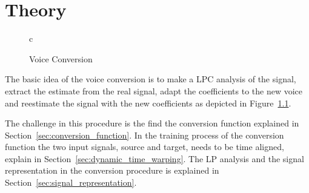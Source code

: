 \chapter{Theory} %
\label{cha:theory}
\begin{figure}[htbp]
  \centering
   \begin{tabular}[h]{c}
  \end{tabular}
  \caption{Voice Conversion}
  \label{fig:VC}
\end{figure}

The basic idea of the voice conversion is to make a LPC analysis of the signal, extract the estimate from the real signal, adapt the coefficients to the new voice and reestimate the signal with the new coefficients as depicted in Figure~\ref{fig:VC}.

The challenge in this procedure is the find the conversion function explained in Section~\ref{sec:conversion_function}. In the training process of the conversion function the two input signals, source and target, needs to be time aligned, explain in Section~\ref{sec:dynamic_time_warping}. The LP analysis and the signal representation in the conversion procedure is explained in Section~\ref{sec:signal_representation}.


